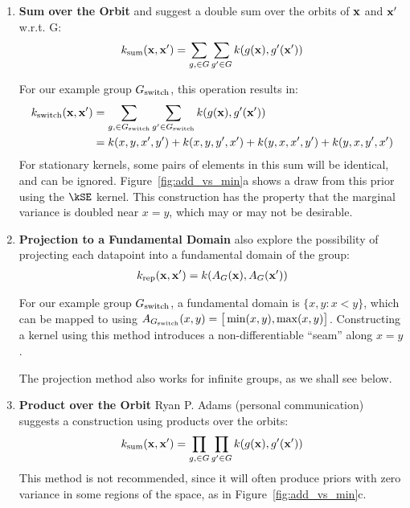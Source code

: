 \begin{enumerate}

\item {\bf Sum over the Orbit} 
\citet{ginsbourger2012argumentwise} and \citet{kondor2008group} suggest a double sum over the orbits of ${\bf{x}}$ and ${\bf{x}}'$ w.r.t. G:
%
\begin{align}
k_\textnormal{sum}({\bf{x}}, {\bf{x}}') = \sum_{g, \in G} \sum_{g' \in G} k( g( {\bf{x}} ), g'( {\bf{x}}') )
\end{align}

For our example group $G_\textnormal{switch}$, this operation results in:
%
\begin{align}
k_\textnormal{switch}({\bf{x}}, {\bf{x}}')
& = \sum_{g, \in G_\textnormal{switch}} \sum_{g' \in G_\textnormal{switch}} k( g( {\bf{x}} ), g'( {\bf{x}}') ) \\
& = k(x, y, x', y') + k(x, y, y', x') + k(y, x, x', y') + k(y, x, y', x')
\end{align}
%
For stationary kernels, some pairs of elements in this sum will be identical, and can be ignored.
Figure~\ref{fig:add_vs_min}a shows a draw from this prior using the $\kSE$ kernel.
This construction has the property that the marginal variance is doubled near $x = y$, which may or may not be desirable.



\item {\bf Projection to a Fundamental Domain}
\citet{Invariances13} also explore the possibility of projecting each datapoint into a fundamental domain of the group:
%
\begin{align}
k_\textnormal{rep}({\bf{x}}, {\bf{x}}') = k( A_G({\bf{x}}), A_G( {\bf{x}}') )
\end{align}
%

For our example group $G_\textnormal{switch}$, a fundamental domain is $\{x, y : x < y\}$, which can be mapped to using $A_{G_\textnormal{switch}}( x, y ) = \big[ \min(x,y), \max(x,y) \big]$.
Constructing a kernel using this method introduces a non-differentiable  ``seam'' along $x = y$.

The projection method also works for infinite groups, as we shall see below.

\item {\bf Product over the Orbit}
Ryan P. Adams (personal communication) suggests a construction using products over the orbits:
%
\begin{align}
k_\textnormal{sum}({\bf{x}}, {\bf{x}}') = \prod_{g, \in G} \prod_{g' \in G} k( g( {\bf{x}} ), g'( {\bf{x}}') )
\end{align}
%
This method is not recommended, since it will often produce \gp{} priors with zero variance in some regions of the space, as in Figure~\ref{fig:add_vs_min}c.
\end{enumerate}


